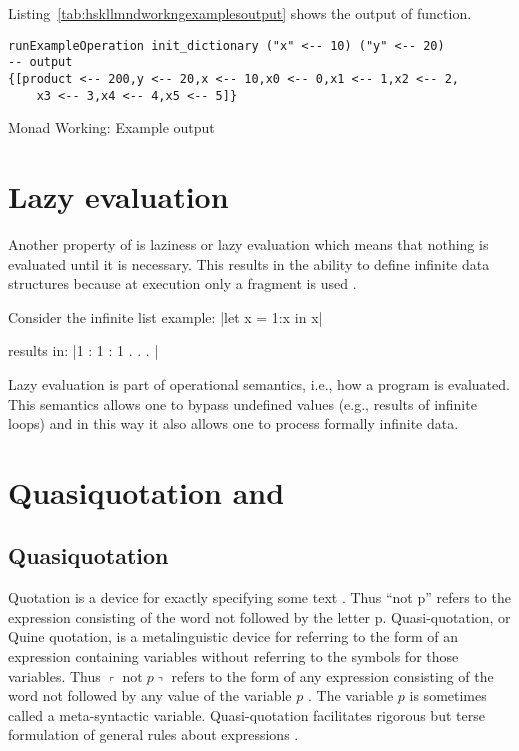\documentclass[thesis-solanki.tex]{subfiles}
\begin{document}
Listing~\ref{tab:hskllmndworkngexamplesoutput} shows the output of  function.

\begin{code-list}[H]
  \begin{singlespace}
\begin{verbatim}
runExampleOperation init_dictionary ("x" <-- 10) ("y" <-- 20)
-- output
{[product <-- 200,y <-- 20,x <-- 10,x0 <-- 0,x1 <-- 1,x2 <-- 2,
    x3 <-- 3,x4 <-- 4,x5 <-- 5]}
\end{verbatim}
  \end{singlespace}
  \caption{ Monad Working: Example output}
\label{tab:hskllmndworkngexamplesoutput}
\end{code-list}


\section{Lazy evaluation}
Another property of  is laziness or lazy evaluation which means that nothing is evaluated until
it is necessary.
This results in the ability to define infinite data structures because at execution only a fragment is used
\cite{website:haskelllazinesswiki}.

Consider the infinite list example:
|let x = 1:x in x|

\noindent results in:
|1 : 1 : 1 . . . |

Lazy evaluation is part of operational semantics, i.e., how a  program is evaluated.
This semantics allows one to bypass undefined values (e.g., results of infinite loops) and in this way it also
allows one to process formally infinite data.

\section{Quasiquotation and }\label{hwh:quasiquotationandhaskell}
\subsection{Quasiquotation}

Quotation is a device for exactly specifying some text \cite{website:quotationstanford}.
Thus ``not p'' refers to the expression consisting of the word not followed by the letter p.
Quasi-quotation, or Quine quotation, is a metalinguistic device for referring to the form of an expression
containing variables without referring to the symbols for those variables.
Thus $\left\ulcorner \mathop\text{not} p \right\urcorner$ refers to the form of any expression consisting of the
word not followed by any value of the variable $p$ \cite{website:quasiquotationfreedictionary}.
The variable $p$ is sometimes called a meta-syntactic variable.
Quasi-quotation facilitates rigorous but terse formulation of general rules about expressions \cite{wikiquasi}.
\end{document}
